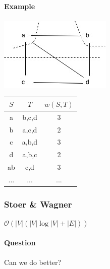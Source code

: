 \paragraph{Example}
\begin{center}
	\includegraphics[scale=0.75]{img/ex435} \\ \vspace*{0.5cm}
\begin{tabular}{ccc} \hline \hline 
	$S$ & $T$ & $w(S,T)$ \\ \hline 
	a & b,c,d & 3 \\
	b & a,c,d & 2 \\
	c & a,b,d & 3 \\
	d & a,b,c & 2 \\
	ab & c,d & 3 \\
	... & ... & ...  \\\hline
\end{tabular}
\end{center}
\subsubsection{Stoer \& Wagner} $\mathcal{O}(|V|(|V|\log|V|+|E|))$ \\
\paragraph{Question} Can we do better? \\
